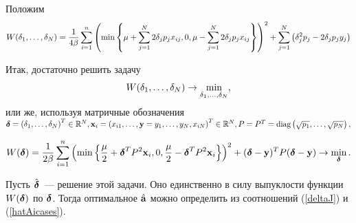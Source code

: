 Положим 
\begin{align}
	W(\idots \delta1N) 
	= \frac1{4\beta} \suml_{i=1}^n \cbr{\min\fbr{\mu + \suml_{j=1}^N2 \delta_j p_jx_{ij}, 0, \mu-\suml_{j=1}^N2 \delta_j p_jx_{ij}}}^2
		+ \suml_{j=1}^N \cbr{ \delta_j^2 p_j  - 2\delta_j p_j y_j}
\end{align}

Итак, достаточно решить задачу 
\begin{align}
	W(\idots \delta1N) \to \min_{\idots \delta1N},
\end{align}
или же, используя матричные обозначения $\mb \delta = \cbr{\idots \delta1N}^T \in \mathbb R^N, \mb x_i = \cbr{x_{i1}, \ldots, \mb y = \idots y1N, x_{iN}}^T \in \mathbb R^N, P = P^T= \diag{\sqrt{p_1}, \ldots, \sqrt{p_N}},$

\begin{align}
	W(\mb \delta) = \frac1{2\beta} \suml_{i=1}^n \cbr{\min\fbr{\frac\mu2 + \mb \delta^T P^2\mb x_i, 0, \frac\mu2- \mb \delta^T P^2\mb x_i}}^2
		+ (\mb \delta - \mb y)^T P (\mb \delta - \mb y) \to \min_{\mb \delta}.
\end{align}

Пусть $\hat{\mb \delta}$~--- решение этой задачи. Оно единственно в силу выпуклости функции $W(\mb \delta)$ по $\mb \delta$. Тогда оптимальное $\hat{\mb a}$ можно определить из соотношений  (\ref{deltaJ}) и (\ref{hatAicases}).